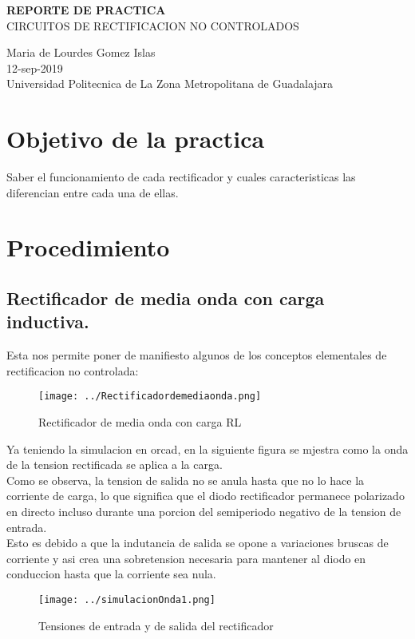 \documentclass[11pt,a4paper]{article}
\begin{document}
\begin{center}
\textbf{REPORTE DE PRACTICA}\\
CIRCUITOS DE RECTIFICACION NO CONTROLADOS
\end{center}

\begin{center}
Maria de Lourdes Gomez Islas\\
12-sep-2019\\
Universidad Politecnica de La Zona Metropolitana de Guadalajara
\end{center}

\section{Objetivo de la practica}
Saber el funcionamiento de cada rectificador y cuales caracteristicas las diferencian entre cada una de ellas.

\section{Procedimiento}
\subsection{Rectificador de media onda con carga inductiva.}
Esta nos permite poner de manifiesto algunos de los conceptos elementales de rectificacion no controlada:

\begin{figure}[h]
\centering
\texttt{[image: ../Rectificadordemediaonda.png]} 
\caption{Rectificador de media onda con carga RL}
\end{figure}

Ya teniendo la simulacion en orcad, en la siguiente figura se mjestra como la onda de la tension rectificada se aplica a la carga.\\
Como se observa, la tension de salida no se anula hasta que no lo hace la corriente de carga, lo que significa que el diodo rectificador permanece polarizado en directo incluso durante una porcion del semiperiodo negativo de la tension de entrada.\\
\newpage Esto es debido a que la indutancia de salida se opone a variaciones bruscas de corriente y asi crea una sobretension necesaria para mantener al diodo en conduccion hasta que la corriente sea nula.

\begin{figure}[h]
\centering
\texttt{[image: ../simulacionOnda1.png]} 
\caption{Tensiones de entrada y de salida del rectificador}
\end{figure}
\end{document}

